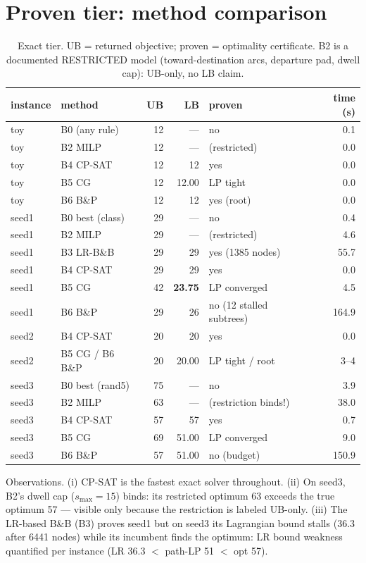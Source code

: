 \documentclass[11pt]{article}
\begin{document}
\section{Proven tier: method comparison}
\begin{table}[h]\centering\small
\caption{Exact tier. UB = returned objective; proven = optimality certificate. B2 is a documented
RESTRICTED model (toward-destination arcs, departure pad, dwell cap): UB-only, no LB claim.}
\begin{tabular}{llrrlr}
\toprule
instance & method & UB & LB & proven & time (s) \\
\midrule
toy & B0 (any rule) & 12 & --- & no & 0.1 \\
toy & B2 MILP & 12 & --- & (restricted) & 0.0 \\
toy & B4 CP-SAT & 12 & 12 & yes & 0.0 \\
toy & B5 CG & 12 & 12.00 & LP tight & 0.0 \\
toy & B6 B\&P & 12 & 12 & yes (root) & 0.0 \\
\midrule
seed1 & B0 best (class) & 29 & --- & no & 0.4 \\
seed1 & B2 MILP & 29 & --- & (restricted) & 4.6 \\
seed1 & B3 LR-B\&B & 29 & 29 & yes (1385 nodes) & 55.7 \\
seed1 & B4 CP-SAT & 29 & 29 & yes & 0.0 \\
seed1 & B5 CG & 42 & \textbf{23.75} & LP converged & 4.5 \\
seed1 & B6 B\&P & 29 & 26 & no (12 stalled subtrees) & 164.9 \\
\midrule
seed2 & B4 CP-SAT & 20 & 20 & yes & 0.0 \\
seed2 & B5 CG / B6 B\&P & 20 & 20.00 & LP tight / root & 3--4 \\
\midrule
seed3 & B0 best (rand5) & 75 & --- & no & 3.9 \\
seed3 & B2 MILP & 63 & --- & (restriction binds!) & 38.0 \\
seed3 & B4 CP-SAT & 57 & 57 & yes & 0.7 \\
seed3 & B5 CG & 69 & 51.00 & LP converged & 9.0 \\
seed3 & B6 B\&P & 57 & 51.00 & no (budget) & 150.9 \\
\bottomrule
\end{tabular}
\end{table}

Observations. (i) CP-SAT is the fastest exact solver throughout. (ii) On seed3, B2's dwell cap
($s_{\max}=15$) binds: its restricted optimum 63 exceeds the true optimum 57 --- visible only because
the restriction is labeled UB-only. (iii) The LR-based B\&B (B3) proves seed1 but on seed3 its
Lagrangian bound stalls (36.3 after 6441 nodes) while its incumbent finds the optimum: LR bound
weakness quantified per instance (LR 36.3 $<$ path-LP 51 $<$ opt 57).
\end{document}
